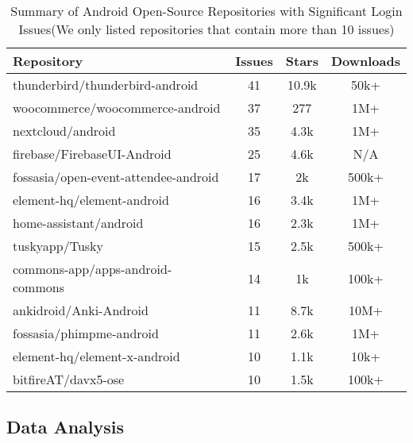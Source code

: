 \begin{table}
  \caption{Summary of Android Open-Source Repositories with Significant Login Issues(We only listed repositories that contain more than 10 issues)  %
  }
  \label{tab:android-issues-significant}
  \centering
  \begin{tabular}{lccc}
    \toprule
    Repository & Issues & Stars& Downloads\\
    \midrule
    thunderbird/thunderbird-android \cite{thunderbird-android} & 41 & 10.9k & 50k+ \\
    woocommerce/woocommerce-android \cite{woocommerce-android} & 37 & 277 & 1M+\\
    nextcloud/android \cite{nextcloud-android} & 35 & 4.3k &1M+ \\
    firebase/FirebaseUI-Android  \cite{firebaseui-android}& 25 & 4.6k & N/A \\
    fossasia/open-event-attendee-android \cite{fossasia} & 17 &2k& 500k+ \\
    element-hq/element-android \cite{element-android} & 16 & 3.4k & 1M+ \\
    home-assistant/android \cite{home-assistant-android}& 16 &2.3k & 1M+ \\
    tuskyapp/Tusky \cite{tusky}& 15 &2.5k &500k+ \\
    commons-app/apps-android-commons \cite{commons-android-commons} & 14 &1k &100k+ \\
    ankidroid/Anki-Android \cite{anki-android}& 11 & 8.7k &10M+ \\
    fossasia/phimpme-android \cite{phimpme-android}& 11 & 2.6k & 1M+ \\
    element-hq/element-x-android \cite{element-x-android}& 10 & 1.1k & 10k+ \\
    bitfireAT/davx5-ose \cite{davx5-ose} & 10 & 1.5k & 100k+ \\
    \bottomrule
  \end{tabular}
\end{table}

\subsection{Data Analysis}

